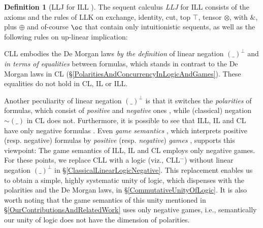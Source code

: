 \documentclass[a4paper]{article}
\theoremstyle{definition}
\newtheorem{definition}{Definition}[section]
\theoremstyle{theorem}
\theoremstyle{remark}
\begin{document}
\begin{definition}[\textsf{LLJ} for ILL \cite{girard1987linear,abramsky1993computational,mellies2009categorical}]
\label{DefLLJ}
The sequent calculus \emph{\textsf{LLJ}} for ILL consists of the axioms and the rules of \textsf{LLK} on exchange, identity, cut, top $\top$, tensor $\otimes$, with $\&$, plus $\oplus$ and of-course $\oc$ that contain only intuitionistic sequents, as well as the following rules on up-linear implication:
\end{definition}

CLL embodies the De Morgan laws \emph{by the definition} of linear negation $(\_)^\bot$ and \emph{in terms of equalities} between formulas, which stands in contrast to the De Morgan laws in CL (\S\ref{PolaritiesAndConcurrencyInLogicAndGames}).
These equalities do not hold in CL, IL or ILL.

Another peculiarity of linear negation $(\_)^\bot$ is that it switches the \emph{polarities} of formulas, which consist of \emph{positive} and \emph{negative} ones \cite{girard1993unity}, while (classical) negation $\mathbin{\sim} (\_)$ in CL does not.
Furthermore, it is possible to see that ILL, IL and CL have only negative formulas \cite{girard1993unity,laurent2003translations}.
Even \emph{game semantics} \cite{hyland1997game}, which interprets positive (resp. negative) formulas by \emph{positive} (resp. \emph{negative}) \emph{games} \cite{laurent2002polarized}, supports this viewpoint: The game semantics of ILL, IL and CL \cite{mccusker1998games,laird1999semantic,herbelin1997games,blot2017realizability,laurent2002polarized} employs only negative games.
For these points, we replace CLL with a logic (viz., CLL$^-$) without linear negation $(\_)^\bot$ in \S\ref{ClassicalLinearLogicNegative}.
This replacement enables us to obtain a simple, highly systematic unity of logic, which dispenses with the polarities and the De Morgan laws, in \S\ref{CommutativeUnityOfLogic}.
It is also worth noting that the game semantics of this unity mentioned in \S\ref{OurContributionsAndRelatedWork} uses only negative games, i.e., semantically our unity of logic does not have the dimension of polarities.
\end{document}
